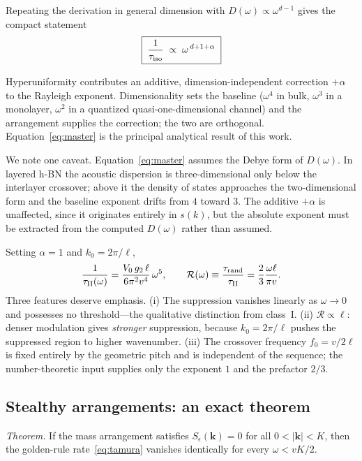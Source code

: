 \documentclass[
  aps,
  prl,
  reprint,
  amsmath,
  amssymb,
  superscriptaddress,
  floatfix,
  nofootinbib
]{revtex4-2}
\newcommand{\kzero}{k_{0}}
\begin{document}
Repeating the derivation in general dimension with
$D(\omega)\propto\omega^{d-1}$ gives the compact statement
\begin{equation}
  \boxed{\;\frac{1}{\tau_{\rm iso}}\;\propto\;\omega^{\,d+1+\alpha}\;}
  \label{eq:master}
\end{equation}

Hyperuniformity contributes an additive, dimension-independent correction
$+\alpha$ to the Rayleigh exponent. Dimensionality sets the baseline
($\omega^{4}$ in bulk, $\omega^{3}$ in a monolayer, $\omega^{2}$ in a
quantized quasi-one-dimensional channel) and the arrangement supplies the
correction; the two are orthogonal. Equation~\eqref{eq:master} is the
principal analytical result of this work.

We note one caveat. Equation~\eqref{eq:master} assumes the Debye form of
$D(\omega)$. In layered h-BN the acoustic dispersion is three-dimensional only
below the interlayer crossover; above it the density of states approaches the
two-dimensional form and the baseline exponent drifts from $4$ toward $3$. The
additive $+\alpha$ is unaffected, since it originates entirely in $s(k)$, but
the absolute exponent must be extracted from the computed $D(\omega)$ rather
than assumed.

Setting $\alpha=1$ and $\kzero=2\pi/\ell$,
\begin{equation}
  \frac{1}{\tau_{\rm II}(\omega)}
    = \frac{V_0\,g_2\,\ell}{6\pi^{2}v^{4}}\,\omega^{5},
  \qquad
  \mathcal{R}(\omega)\equiv\frac{\tau_{\rm rand}}{\tau_{\rm II}}
    = \frac{2}{3}\frac{\omega\ell}{\pi v}.
  \label{eq:classII}
\end{equation}
Three features deserve emphasis. (i) The suppression vanishes linearly as
$\omega\to0$ and possesses no threshold---the qualitative distinction from
class~I. (ii) $\mathcal{R}\propto\ell$: denser modulation gives \emph{stronger}
suppression, because $\kzero=2\pi/\ell$ pushes the suppressed region to higher
wavenumber. (iii) The crossover frequency $f_0=v/2\ell$ is fixed entirely by
the geometric pitch and is independent of the sequence; the number-theoretic
input supplies only the exponent $1$ and the prefactor $2/3$.

\subsection{Stealthy arrangements: an exact theorem}
\label{sec:stealthy}

\emph{Theorem.} If the mass arrangement satisfies $S_\epsilon(\bm k)=0$ for all
$0<|\bm k|<K$, then the golden-rule rate~\eqref{eq:tamura} vanishes identically
for every $\omega<vK/2$.
\end{document}
